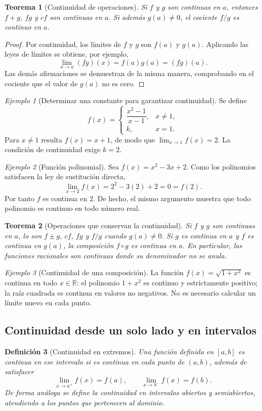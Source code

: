 \documentclass[12pt]{article}
\newtheorem{definicion}{Definición}[section]
\newtheorem{teorema}[definicion]{Teorema}
\theoremstyle{remark}
\newtheorem{ejemplo}{Ejemplo}
\newcommand{\R}{\mathbb{R}}
\begin{document}
\begin{teorema}[Continuidad de operaciones]
Si $f$ y $g$ son continuas en $a$, entonces $f+g$, $fg$ y $cf$ son continuas en $a$. Si además $g(a)\ne0$, el cociente $f/g$ es continuo en $a$.
\end{teorema}
\begin{proof}
Por continuidad, los límites de $f$ y $g$ son $f(a)$ y $g(a)$. Aplicando las leyes de límites se obtiene, por ejemplo,
\[
 \lim_{x\to a}(fg)(x)=f(a)g(a)=(fg)(a).
\]
Las demás afirmaciones se demuestran de la misma manera, comprobando en el cociente que el valor de $g(a)$ no es cero.
\end{proof}

\begin{ejemplo}[Determinar una constante para garantizar continuidad]
Se define
\[
 f(x)=\begin{cases}\dfrac{x^2-1}{x-1},&x\ne1,\\k,&x=1.\end{cases}
\]
Para $x\ne1$ resulta $f(x)=x+1$, de modo que $\lim_{x\to1}f(x)=2$. La condición de continuidad exige $k=\boxed2$.
\end{ejemplo}

\begin{ejemplo}[Función polinomial]
Sea $f(x)=x^2-3x+2$. Como los polinomios satisfacen la ley de sustitución directa,
\[
 \lim_{x\to2}f(x)=2^2-3(2)+2=0=f(2).
\]
Por tanto $f$ es continua en $2$. De hecho, el mismo argumento muestra que todo polinomio es continuo en todo número real.
\end{ejemplo}

\begin{teorema}[Operaciones que conservan la continuidad]
Si $f$ y $g$ son continuas en $a$, lo son $f\pm g$, $cf$, $fg$ y $f/g$ cuando $g(a)\ne0$. Si $g$ es continua en $a$ y $f$ es continua en $g(a)$, la composición $f\circ g$ es continua en $a$. En particular, las funciones racionales son continuas donde su denominador no se anula.
\end{teorema}

\begin{ejemplo}[Continuidad de una composición]
La función $f(x)=\sqrt{1+x^2}$ es continua en todo $x\in\R$: el polinomio $1+x^2$ es continuo y estrictamente positivo; la raíz cuadrada es continua en valores no negativos. No es necesario calcular un límite nuevo en cada punto.
\end{ejemplo}

\subsection*{Continuidad desde un solo lado y en intervalos}
\begin{definicion}[Continuidad en extremos]
Una función definida en $[a,b]$ es continua en ese intervalo si es continua en cada punto de $(a,b)$, además de satisfacer
\[
 \lim_{x\to a^+}f(x)=f(a),\qquad
 \lim_{x\to b^-}f(x)=f(b).
\]
De forma análoga se define la continuidad en intervalos abiertos y semiabiertos, atendiendo a los puntos que pertenecen al dominio.
\end{definicion}
\end{document}
